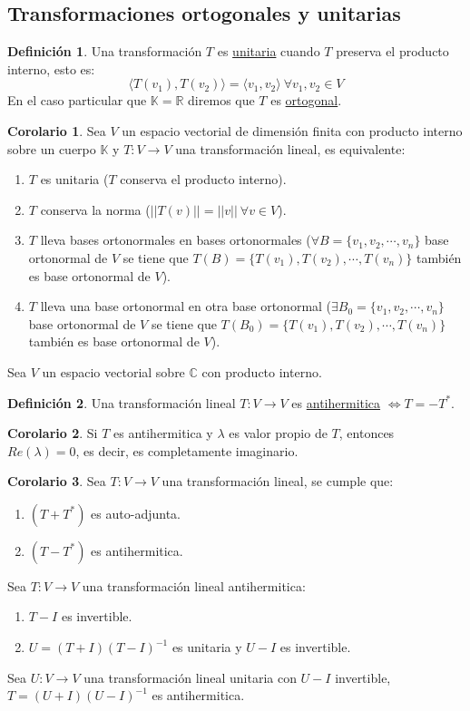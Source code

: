 \documentclass[10pt]{article}
\theoremstyle{definition}
\newtheorem{definition}{Definición}[section]
\newtheorem{corollary}{Corolario}[theorem]
\begin{document}
\subsection{Transformaciones ortogonales y unitarias}
\begin{definition}
    Una transformación $T$ es \underline{unitaria} cuando $T$ preserva el producto interno, esto es: $$\langle T(v_1),T(v_2)\rangle=\langle v_1,v_2\rangle\ \forall v_1,v_2\in V$$
    En el caso particular que $\mathbb{K}=\mathbb{R}$ diremos que $T$ es \underline{ortogonal}.
\end{definition}
\begin{corollary}
    Sea $V$ un espacio vectorial de dimensión finita con producto interno sobre un cuerpo $\mathbb{K}$ y $T:V\to V$ una transformación lineal, es equivalente:
    \begin{enumerate}
        \item $T$ es unitaria ($T$ conserva el producto interno).
        \item $T$ conserva la norma ($||T(v)||=||v||\ \forall v\in V$).
        \item $T$ lleva bases ortonormales en bases ortonormales ($\forall B=\{v_1,v_2,\cdots,v_n\}$ base ortonormal de $V$ se tiene que $T(B)=\{T(v_1),T(v_2),\cdots,T(v_n)\}$ también es base ortonormal de $V$).
        \item $T$ lleva una base ortonormal en otra base ortonormal ($\exists B_0=\{v_1,v_2,\cdots,v_n\}$ base ortonormal de $V$ se tiene que $T(B_0)=\{T(v_1),T(v_2),\cdots,T(v_n)\}$ también es base ortonormal de $V$).
    \end{enumerate}
\end{corollary}
Sea $V$ un espacio vectorial sobre $\mathbb{C}$ con producto interno.
\begin{definition}
    Una transformación lineal $T:V\to V$ es \underline{antihermitica} $\Leftrightarrow T=-T^*$.
\end{definition}
\begin{corollary}
    Si $T$ es antihermitica y $\lambda$ es valor propio de $T$, entonces $Re(\lambda)=0$, es decir, es completamente imaginario.
\end{corollary}
\begin{corollary}
    Sea $T:V\to V$ una transformación lineal, se cumple que:
    \begin{enumerate}
        \item $(T+T^*)$ es auto-adjunta.
        \item $(T-T^*)$ es antihermitica.
    \end{enumerate}
    Sea $T:V\to V$ una transformación lineal antihermitica:
    \begin{enumerate}
        \item $T-I$ es invertible.
        \item $U=(T+I)(T-I)^{-1}$ es unitaria y $U-I$ es invertible.
    \end{enumerate}
    Sea $U:V\to V$ una transformación lineal unitaria con $U-I$ invertible, $T=(U+I)(U-I)^{-1}$ es antihermitica.
\end{corollary}\newpage
\end{document}
